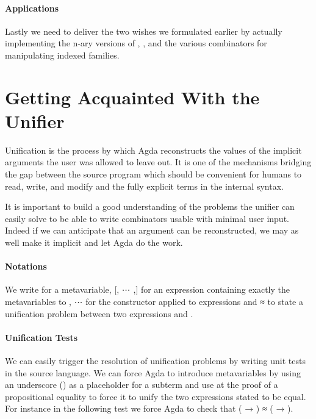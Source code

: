\paragraph{Applications} Lastly we need to deliver the two wishes we
formulated earlier by actually implementing the n-ary versions of ,
, and the various combinators for manipulating indexed families.

\section{Getting Acquainted With the Unifier}\label{sec:unifier}

Unification is the process by which Agda reconstructs the values of the
implicit arguments the user was allowed to leave out. It is one of the
mechanisms bridging the gap between the source program which should be
convenient for humans to read, write, and modify and the fully explicit
terms in the internal syntax.

It is important to build a good understanding of the problems the unifier
can easily solve to be able to write combinators usable with minimal user
input. Indeed if we can anticipate that an argument can be reconstructed,
we may as well make it implicit and let Agda do the work.

\paragraph{Notations} We write  for a
metavariable, [, ⋯ ,] for an expression 
containing exactly the metavariables  to ,
  ⋯  for the constructor  applied to 
expressions and { ≈ } to state a unification problem
between two expressions  and .

\paragraph{Unification Tests} We can easily trigger the resolution of
unification problems by writing unit tests in the source language. We can
force Agda to introduce metavariables by using an underscore (\AF{\_}) as a
placeholder for a subterm and use  at the proof of a propositional
equality to force it to unify the two expressions stated to be equal. For
instance in the following test we force Agda to check that
{( → ) ≈ ( → )}.

